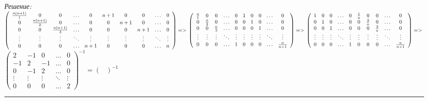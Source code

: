\documentclass[a4paper, 12pt]{article}
\newenvironment{solution}
    {\textit{Решение: }}
    {\noindent\rule{7in}{1.5pt}}
\begin{document}
\begin{solution}
$
\left(
\begin{array}{cccccccccc}
\frac{n(n+1)}{1} & 0 & 0 & \ldots & 0  & n + 1 & 0 & 0 & \ldots & 0 \\
0 & \frac{n(n+1)}{2} & 0 & \ldots & 0  & 0 & n + 1 & 0 & \ldots & 0 \\
0 & 0 & \frac{n(n+1)}{3} & \ldots & 0  & 0 & 0 & n + 1 & \ldots & 0 \\
\vdots & \vdots & \vdots & \ddots & \vdots & \vdots & \vdots & \vdots & \ddots & \vdots \\
0 & 0 & 0 & \ldots & n+1 & 0 & 0 & 0 & \ldots & n
\end{array}
\right)
=> \\
\left(
\begin{array}{cccccccccc}
\frac{n}{1} & 0 & 0 & \ldots & 0  & 1 & 0 & 0 & \ldots & 0 \\
0 & \frac{n}{2} & 0 & \ldots & 0  & 0 & 1 & 0 & \ldots & 0 \\
0 & 0 & \frac{n}{3} & \ldots & 0  & 0 & 0 & 1 & \ldots & 0 \\
\vdots & \vdots & \vdots & \ddots & \vdots & \vdots & \vdots & \vdots & \ddots & \vdots \\
0 & 0 & 0 & \ldots & 1 & 0 & 0 & 0 & \ldots & \frac{n}{n+1}
\end{array}
\right)
=> \\
\left(
\begin{array}{cccccccccc}
1 & 0 & 0 & \ldots & 0  & \frac{1}{n} & 0 & 0 & \ldots & 0 \\
0 & 1 & 0 & \ldots & 0  & 0 & \frac{2}{n} & 0 & \ldots & 0 \\
0 & 0 & 1 & \ldots & 0  & 0 & 0 & \frac{3}{n} & \ldots & 0 \\
\vdots & \vdots & \vdots & \ddots & \vdots & \vdots & \vdots & \vdots & \ddots & \vdots \\
0 & 0 & 0 & \ldots & 1 & 0 & 0 & 0 & \ldots & \frac{n}{n+1}
\end{array}
\right)
=> \\
$
$
\left(
\begin{array}{ccccc}
2 & -1 & 0 & \ldots & 0 \\
-1 & 2 & -1 & \ldots & 0 \\
0 & -1 & 2 & \ldots & 0 \\
\vdots & \vdots & \vdots & \ddots & \vdots \\
0 & 0 & 0 & \ldots & 2
\end{array}
\right)^{-1}
=
\left(
\begin{array}{ccccc}
\end{array}
\right)^{-1}
$

\end{solution} 
\end{document}
